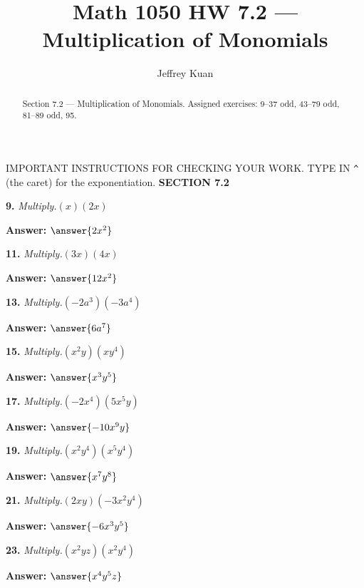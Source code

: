 \documentclass{ximera}
\author{Jeffrey Kuan}
\title{Math 1050 HW 7.2 --- Multiplication of Monomials}
\begin{document}
\begin{abstract}
    Section 7.2 --- Multiplication of Monomials.
    Assigned exercises: 9–37 odd, 43–79 odd, 81–89 odd, 95.
\end{abstract}

\maketitle

IMPORTANT INSTRUCTIONS FOR CHECKING YOUR WORK. TYPE IN \texttt{\^{}} (the caret) for the exponentiation. \textbf{SECTION 7.2}

\begin{problem}
\textbf{9.} \emph{Multiply.}\quad $(x)(2x)$

\textbf{Answer:} $\answer{2x^2}$
\end{problem}

\begin{problem}
\textbf{11.} \emph{Multiply.}\quad $(3x)(4x)$

\textbf{Answer:} $\answer{12x^2}$
\end{problem}

\begin{problem}
\textbf{13.} \emph{Multiply.}\quad $(-2a^3)(-3a^4)$

\textbf{Answer:} $\answer{6a^7}$
\end{problem}

\begin{problem}
\textbf{15.} \emph{Multiply.}\quad $(x^2y)(xy^4)$

\textbf{Answer:} $\answer{x^3y^5}$
\end{problem}

\begin{problem}
\textbf{17.} \emph{Multiply.}\quad $(-2x^4)(5x^5y)$

\textbf{Answer:} $\answer{-10x^9y}$
\end{problem}

\begin{problem}
\textbf{19.} \emph{Multiply.}\quad $(x^2y^4)(x^5y^4)$

\textbf{Answer:} $\answer{x^7y^8}$
\end{problem}

\begin{problem}
\textbf{21.} \emph{Multiply.}\quad $(2xy)(-3x^2y^4)$

\textbf{Answer:} $\answer{-6x^3y^5}$
\end{problem}

\begin{problem}
\textbf{23.} \emph{Multiply.}\quad $(x^2yz)(x^2y^4)$

\textbf{Answer:} $\answer{x^4y^5z}$
\end{problem}
\end{document}
